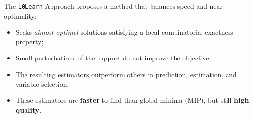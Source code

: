 \begin{frame}{The \texttt{L0Learn} Approach}
\cite{fastselect} proposes a method that balances speed and near-optimality: 
\begin{itemize}
\item Seeks \textit{almost optimal} solutions satisfying a local combinatorial exactness property;
\item Small perturbations of the support do not improve the objective;
\item The resulting estimators outperform others in prediction, estimation, and variable selection;
\item These estimators are \textbf{faster} to find than global minima (MIP), but still \textbf{high quality}.
\end{itemize}
\end{frame}
